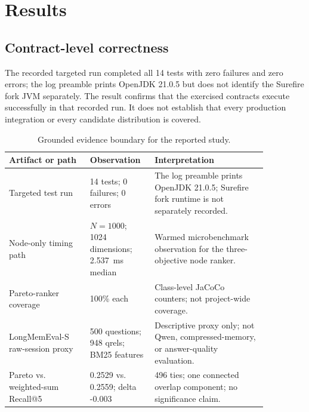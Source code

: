 \documentclass[review,12pt]{elsarticle}
\begin{document}
\section{Results}
\label{sec:results}

\subsection{Contract-level correctness}

The recorded targeted run completed all 14 tests with zero failures and zero errors; the log preamble prints OpenJDK 21.0.5 but does not identify the Surefire fork JVM separately. The result confirms that the exercised contracts execute successfully in that recorded run. It does not establish that every production integration or every candidate distribution is covered.

\begin{table}[t]
\centering
\caption{Grounded evidence boundary for the reported study.}
\label{tab:evidence-boundary}
\begin{tabular}{p{0.28\linewidth}p{0.19\linewidth}p{0.39\linewidth}}
\toprule
Artifact or path & Observation & Interpretation \\
\midrule
Targeted test run & 14 tests; 0 failures; 0 errors & The log preamble prints OpenJDK 21.0.5; Surefire fork runtime is not separately recorded. \\
Node-only timing path & $N=1000$; 1024 dimensions; 2.537~ms median & Warmed microbenchmark observation for the three-objective node ranker. \\
Pareto-ranker coverage & 100\% each & Class-level JaCoCo counters; not project-wide coverage. \\
LongMemEval-S raw-session proxy & 500 questions; 948 qrels; BM25 features & Descriptive proxy only; not Qwen, compressed-memory, or answer-quality evaluation. \\
Pareto vs. weighted-sum Recall@5 & 0.2529 vs. 0.2559; delta -0.003 & 496 ties; one connected overlap component; no significance claim. \\
\bottomrule
\end{tabular}
\end{table}
\end{document}
